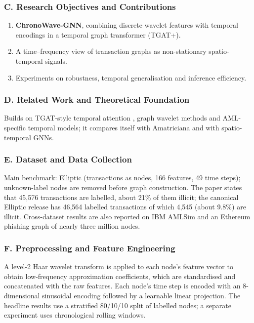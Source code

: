 \documentclass[11pt,a4paper]{article}
\begin{document}
\subsubsection*{C. Research Objectives and Contributions}
\begin{enumerate}[leftmargin=*]
    \item \textbf{ChronoWave-GNN}, combining discrete wavelet features with temporal encodings in a temporal graph transformer (TGAT+).
    \item A time--frequency view of transaction graphs as non-stationary spatio-temporal signals.
    \item Experiments on robustness, temporal generalisation and inference efficiency.
\end{enumerate}

\subsubsection*{D. Related Work and Theoretical Foundation}
Builds on TGAT-style temporal attention \cite{xu2020tgat}, graph wavelet methods and AML-specific temporal models; it compares itself with Amatriciana and with spatio-temporal GNNs.

\subsubsection*{E. Dataset and Data Collection}
Main benchmark: Elliptic (transactions as nodes, 166 features, 49 time steps); unknown-label nodes are removed before graph construction. The paper states that 45,576 transactions are labelled, about 21\% of them illicit; the canonical Elliptic release has 46,564 labelled transactions of which 4,545 (about 9.8\%) are illicit. Cross-dataset results are also reported on IBM AMLSim and an Ethereum phishing graph of nearly three million nodes.

\subsubsection*{F. Preprocessing and Feature Engineering}
A level-2 Haar wavelet transform is applied to each node's feature vector to obtain low-frequency approximation coefficients, which are standardised and concatenated with the raw features. Each node's time step is encoded with an 8-dimensional sinusoidal encoding followed by a learnable linear projection. The headline results use a stratified 80/10/10 split of labelled nodes; a separate experiment uses chronological rolling windows.
\end{document}
